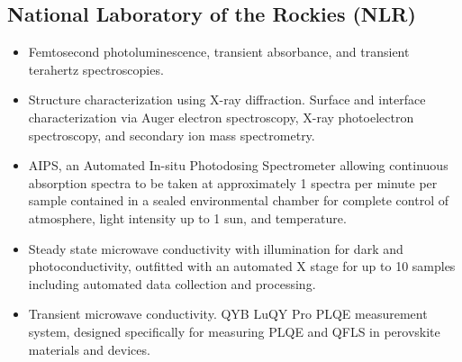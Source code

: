 \documentclass{NSF}
\begin{document}
\subsection{National Laboratory of the Rockies (NLR)}\hfill

\begin{itemize}

\item  Femtosecond photoluminescence, transient absorbance, and transient terahertz spectroscopies.
\item Structure characterization using X-ray diffraction.  Surface and interface characterization via Auger electron spectroscopy, X-ray photoelectron spectroscopy, and secondary ion mass spectrometry.
\item AIPS, an Automated In-situ Photodosing Spectrometer allowing continuous absorption spectra to be taken at approximately 1 spectra per minute per sample contained in a sealed environmental chamber for complete control of atmosphere, light intensity up to 1 sun, and temperature.
\item Steady state microwave conductivity with illumination for dark and photoconductivity, outfitted with an automated X stage for up to 10 samples including automated data collection and processing.
\item Transient microwave conductivity. 
QYB LuQY Pro PLQE measurement system, designed specifically for measuring PLQE and QFLS in perovskite materials and devices.

\end{itemize}
\end{document}
